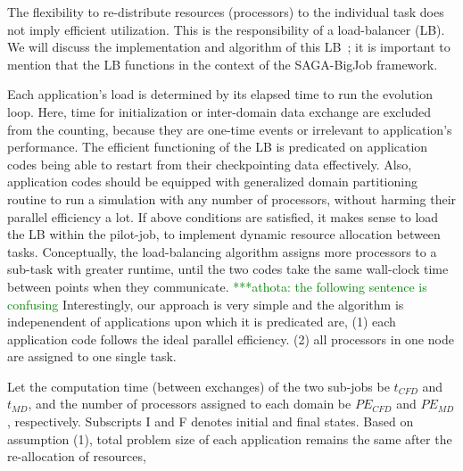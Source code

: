 \documentclass[conference,final]{IEEEtran}
\newcommand{\athotanote}[1]{ {\textcolor{green} { ***athota: #1 }}}
\begin{document}


The flexibility to re-distribute resources (processors) to the
individual task does not imply efficient utilization. This is the
responsibility of a load-balancer (LB). We will discuss the
implementation and algorithm of this LB~\cite{Ko}; it is important to mention
that the LB functions in the context of the SAGA-BigJob framework.

Each application's load is determined by its elapsed time to run the
evolution loop. Here, time for initialization or inter-domain data
exchange are excluded from the counting, because they are one-time
events or irrelevant to application's performance.  The efficient
functioning of the LB is predicated on application codes being able to
restart from their checkpointing data effectively.  Also, application
codes should be equipped with generalized domain partitioning routine
to run a simulation with any number of processors, without harming
their parallel efficiency a lot. If above conditions are satisfied, it
makes sense to load the LB within the pilot-job, to implement dynamic
resource allocation between tasks.  Conceptually, the load-balancing
algorithm assigns more processors to a sub-task with greater runtime,
until the two codes take the same wall-clock time between points when they
communicate. \athotanote{the following sentence is confusing}Interestingly, our approach is very simple and the
algorithm is indepenendent of applications upon which it is predicated
are, (1) each application code follows the ideal parallel efficiency.
(2) all processors in one node are assigned to one single task.

Let the computation time (between exchanges) of the two sub-jobs be
$t_{CFD}$ and $t_{MD}$, and the number of processors assigned to each
domain be $PE_{CFD}$ and $PE_{MD}$, respectively. Subscripts I and F
denotes initial and final states. Based on assumption (1), total
problem size of each application remains the same after the
re-allocation of resources,
\end{document}

